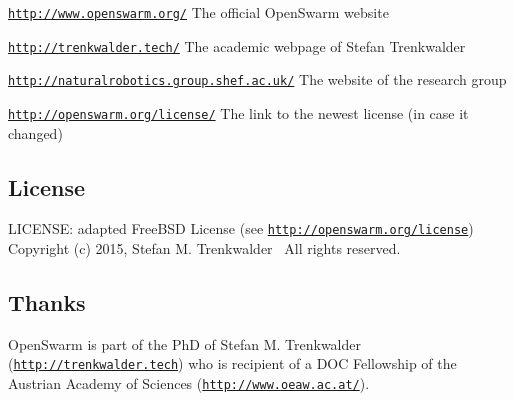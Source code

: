 \begin{DoxyItemize}
\item \href{http://www.openswarm.org/}{\tt http\+://www.\+openswarm.\+org/} The official Open\+Swarm website
\item \href{http://trenkwalder.tech/}{\tt http\+://trenkwalder.\+tech/} The academic webpage of Stefan Trenkwalder
\item \href{http://naturalrobotics.group.shef.ac.uk/}{\tt http\+://naturalrobotics.\+group.\+shef.\+ac.\+uk/} The website of the research group
\item \href{http://openswarm.org/license/}{\tt http\+://openswarm.\+org/license/} The link to the newest license (in case it changed)
\end{DoxyItemize}\hypertarget{index_base_license}{}\subsection{License}\label{index_base_license}
L\+I\+C\+E\+N\+S\+E\+: adapted Free\+B\+S\+D License (see \href{http://openswarm.org/license}{\tt http\+://openswarm.\+org/license})~\newline
Copyright (c) 2015, Stefan M. Trenkwalder~\newline
All rights reserved.\hypertarget{index_base_thanks}{}\subsection{Thanks}\label{index_base_thanks}
Open\+Swarm is part of the Ph\+D of Stefan M. Trenkwalder (\href{http://trenkwalder.tech}{\tt http\+://trenkwalder.\+tech}) who is recipient of a D\+O\+C Fellowship of the Austrian Academy of Sciences (\href{http://www.oeaw.ac.at/}{\tt http\+://www.\+oeaw.\+ac.\+at/}). 